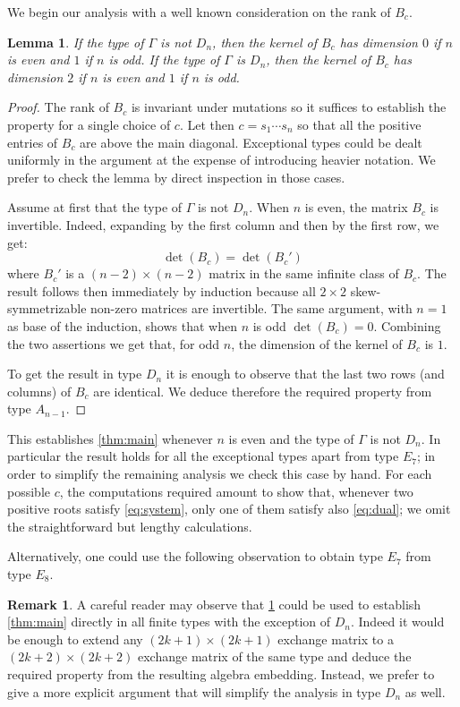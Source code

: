 \documentclass[11pt]{amsart}
\newtheorem{lemma}[theorem]{Lemma}
\theoremstyle{definition}
\newtheorem{remark}[theorem]{Remark}
\numberwithin{equation}{section}
\numberwithin{figure}{section}
\begin{document}
  We begin our analysis with a well known consideration on the rank of $B_c$.
  \begin{lemma}
    \label{lem:dimensions}
    If the type of $\Gamma$ is not $D_n$, then the kernel of $B_c$ has dimension $0$ if $n$ is even and $1$ if $n$ is odd.
    If the type of $\Gamma$ is $D_n$, then the kernel of $B_c$ has dimension $2$ if $n$ is even and $1$ if $n$ is odd.
  \end{lemma}
  \begin{proof}
    The rank of $B_c$ is invariant under mutations so it suffices to establish the property for a single choice of $c$.
    Let then $c=s_1\cdots s_n$ so that all the positive entries of $B_c$ are above the main diagonal.
    Exceptional types could be dealt uniformly in the argument at the expense of introducing heavier notation.
    We prefer to check the lemma by direct inspection in those cases.

    Assume at first that the type of $\Gamma$ is not $D_n$.
    When $n$ is even, the matrix $B_c$ is invertible.
    Indeed, expanding by the first column and then by the first row, we get:
    \[
      \det(B_c)=\det(B_c')
    \]
    where $B_c'$ is a $(n-2)\times(n-2)$ matrix in the same infinite class of $B_c$.
    The result follows then immediately by induction because all $2\times2$ skew-symmetrizable non-zero matrices are invertible.
    The same argument, with $n=1$ as base of the induction, shows that when $n$ is odd $\det(B_c)=0$.
    Combining the two assertions we get that, for odd $n$, the dimension of the kernel of $B_c$ is $1$.

    To get the result in type $D_n$ it is enough to observe that the last two rows (and columns) of $B_c$ are identical.
    We deduce therefore the required property from type $A_{n-1}$.
  \end{proof}

  This establishes \cref{thm:main} whenever $n$ is even and the type of $\Gamma$ is not $D_n$.
  In particular the result holds for all the exceptional types apart from type $E_7$; in order to simplify the remaining analysis we check this case by hand.
  For each possible $c$, the computations required amount to show that, whenever two positive roots satisfy \cref{eq:system}, only one of them satisfy also \cref{eq:dual}; we omit the straightforward but lengthy calculations.

  Alternatively, one could use the following observation to obtain type $E_7$ from type $E_8$.

  \begin{remark}
    \label{rk:induction}
    A careful reader may observe that \cref{lem:dimensions} could be used to establish \cref{thm:main} directly in all finite types with the exception of $D_n$.
    Indeed it would be enough to extend any $(2k+1) \times (2k+1)$ exchange matrix to a $(2k+2) \times (2k+2)$ exchange matrix of the same type and deduce the required property from the resulting algebra embedding.
    Instead, we prefer to give a more explicit argument that will simplify the analysis in type $D_n$ as well.
  \end{remark}
\end{document}
